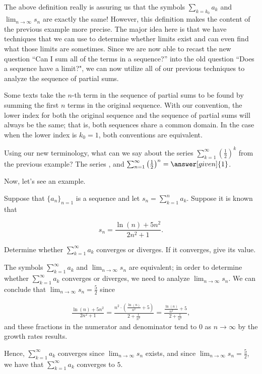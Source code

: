 \documentclass{ximera}
\begin{document}
The above definition really is assuring us that the symbols $\sum_{k=k_0} a_k$ and $\lim_{n \to \infty} s_n$ are exactly the same! However, this definition makes the content of the previous example more precise.  The major idea here is that we have techniques that we can use to determine whether limits exist and can even find what those limits are sometimes.  Since we are now able to recast the new question ``Can I sum all of the terms in a sequence?'' into the old question ``Does a sequence have a limit?", we can now utilize all of our previous techniques to analyze the sequence of partial sums.

\begin{remark}
Some texts take the $n$-th term in the sequence of partial sums to be found by summing the first $n$ terms in the original sequence.  With our convention, the lower index for both the original sequence and the sequence of partial sums will always be the same; that is, both sequences share a common domain.  In the case when the lower index is $k_0=1$, both conventions are equivalent.
\end{remark}

\begin{question}
  Using our new terminology, what can we say about the series $\sum_{k=1}^\infty \left(\frac{1}{2}\right)^k$ from the previous example?  The series     , and
      $\sum_{n=1}^\infty \left(\frac{1}{2}\right)^n = \answer[given]{1}$.
  \end{question}

Now, let's see an example.

\begin{example}
Suppose that $\{a_n\}_{n=1}$ is a sequence and let $s_n = \sum_{k=1}^n a_k$.  Suppose it is known that

\[
s_n = \frac{\ln(n)+5n^2}{2n^2+1}.
\]

Determine whether $\sum_{k=1}^{\infty} a_k$ converges or diverges.  If it converges, give its value.

\begin{explanation}
The symbols $\sum_{k=1}^{\infty} a_k$ and $\lim_{n \to \infty} s_n$ are equivalent; in order to determine whether $\sum_{k=1}^{\infty} a_k$ converges or diverges, we need to analyze $\lim_{n \to \infty} s_n$.  We can conclude that $\lim_{n \to \infty} s_n = \frac{5}{2}$ since

\begin{align*}
\frac{\ln(n)+5n^2}{2n^2+1} = \frac{n^2 \cdot \left(\frac{\ln(n)}{n^2}+5\right)}{2+\frac{1}{n^2}}= \frac{\frac{\ln(n)}{n^2}+5}{2+\frac{1}{n^2}},
\end{align*} 
and these fractions in the numerator and denominator tend to $0$ as $n \to \infty$ by the growth rates results.

Hence, $\sum_{k=1}^{\infty} a_k$ converges since  $\lim_{n \to \infty} s_n$ exists, and since  $\lim_{n \to \infty} s_n=\frac{5}{2}$, we have that $\sum_{k=1}^{\infty} a_k$ converges to $5$.
\end{explanation}

\end{example}
\end{document}
